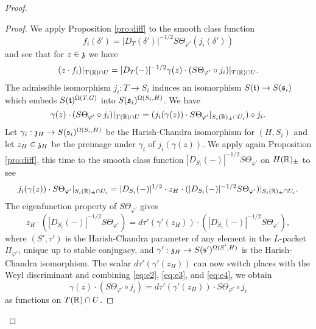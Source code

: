 \documentclass{article}
\theoremstyle{definition}
\numberwithin{equation}{section}
\renewcommand{\-}{\hyp{}}
\begin{document}
\begin{proof}
\begin{proof}
		We apply Proposition \ref{pro:diff} to the smooth class function 
		\[ f_i(\delta') = |D_T(\delta')|^{-1/2}S\Theta_{\varphi'}(j_i(\delta')) \]
		and see that for $z \in \mathfrak{z}$ we have
		\begin{equation} \label{eq:e1}
		(z \cdot f_i)|_{T(\mathbb{R}) \cap U} = |D_T(-)|^{-1/2}\gamma(z) \cdot (S\Theta_{\varphi'}\circ j_i)|_{T(\mathbb{R}) \cap U}.
		\end{equation}
		The admissible isomorphism $j_i : T \to S_i$ induces an isomorphism $S(\mathfrak{t}) \to S(\mathfrak{s}_i)$ which embeds $S(\mathfrak{t})^{\Omega(T,G)}$ into $S(\mathfrak{s}_i)^{\Omega(S_i,H)}$. We have
		\begin{equation} \label{eq:e2}
		\gamma(z) \cdot (S\Theta_{\varphi'}\circ j_i)|_{T(\mathbb{R}) \cap U} = (j_i(\gamma(z)) \cdot S\Theta_{\varphi'}|_{S_i(\mathbb{R})_\pm \cap U_i}) \circ j_i.
		\end{equation}
		Let $\gamma_i : \mathfrak{z}_H \to S(\mathfrak{s}_i)^{\Omega(S_i,H)}$ be the Harish-Chandra isomorphism for $(H,S_i)$ and let $z_H \in \mathfrak{z}_H$ be the preimage under $\gamma_i$ of $j_i(\gamma(z))$. We apply again Proposition \ref{pro:diff}, this time to the smooth class function $|D_{S_i}(-)|^{-1/2}S\Theta_{\varphi'}$ on $H(\mathbb{R})_\pm$ to see
		\begin{equation} \label{eq:e3}
		j_i(\gamma(z)) \cdot S\Theta_{\varphi'}|_{S_i(\mathbb{R})_\pm \cap U_i} = |D_{S_i}(-)|^{1/2}\cdot z_H \cdot (|D_{S_i}(-)|^{-1/2}S\Theta_{\varphi'})|_{S_i(\mathbb{R})_\pm \cap U_i}.
		\end{equation}
		The eigenfunction property of $S\Theta_{\varphi'}$ gives
		\begin{equation} \label{eq:e4}
		z_H \cdot (|D_{S_i}(-)|^{-1/2}S\Theta_{\varphi'}) = d\tau'(\gamma'(z_H)) \cdot (|D_{S_i}(-)|^{-1/2}S\Theta_{\varphi'}),
		\end{equation}
		where $(S',\tau')$ is the Harish-Chandra parameter of any element in the $L$-packet $\Pi_{\varphi'}$, unique up to stable conjugacy, and $\gamma' : \mathfrak{z}_H \to S(\mathfrak{s'})^{\Omega(S',H)}$ is the Harish-Chandra isomorphism. The scalar $d\tau'(\gamma'(z_H))$ can now switch places with the Weyl discriminant and combining \eqref{eq:e2}, \eqref{eq:e3}, and \eqref{eq:e4}, we obtain
		\begin{equation} \label{eq:e5}
		\gamma(z) \cdot (S\Theta_{\varphi'}\circ j_i) = d\tau'(\gamma'(z_H)) \cdot S\Theta_{\varphi'} \circ j_i 
		\end{equation}
		as functions on $T(\mathbb{R}) \cap U$.
		


\end{proof}
\end{proof}
\end{document}
